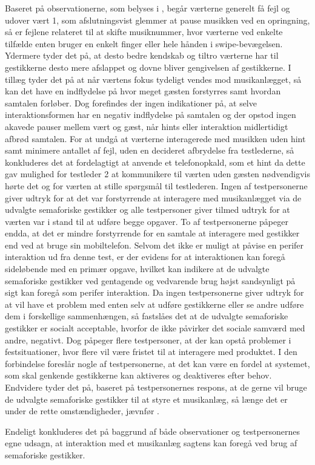 Baseret på observationerne, som belyses i , begår værterne generelt få fejl og udover vært 1, som afslutningsvist glemmer at pause musikken ved en opringning, så er fejlene relateret til at skifte musiknummer, hvor værterne ved enkelte tilfælde enten bruger en enkelt finger eller hele hånden i swipe-bevægelsen. Ydermere tyder det på, at desto bedre kendskab og tiltro værterne har til gestikkerne desto mere afslappet og dovne bliver gengivelsen af gestikkerne. I tillæg tyder det på at når værtens fokus tydeligt vendes mod musikanlægget, så kan det have en indflydelse på hvor meget gæsten forstyrres samt hvordan samtalen forløber. Dog forefindes der ingen indikationer på, at selve interaktionsformen har en negativ indflydelse på samtalen og der opstod ingen akavede pauser mellem vært og gæst, når hints eller interaktion midlertidigt afbrød samtalen. For at undgå at værterne interagerede med musikken uden hint samt minimere antallet af fejl, uden en decideret afbrydelse fra testlederne, så konkluderes det at fordelagtigt at anvende et telefonopkald, som et hint da dette gav mulighed for testleder 2 at kommunikere til værten uden gæsten nødvendigvis hørte det og for værten at stille spørgsmål til testlederen.\blankline
%
Ingen af testpersonerne giver udtryk for at det var forstyrrende at interagere med musikanlægget via de udvalgte semaforiske gestikker og alle testpersoner giver tilmed udtryk for at værten var i stand til at udføre begge opgaver. To af testpersonerne påpeger endda, at det er mindre forstyrrende for en samtale at interagere med gestikker end ved at bruge sin mobiltelefon. Selvom det ikke er muligt at påvise en perifer interaktion ud fra denne test, er der evidens for at interaktionen kan foregå sideløbende med en primær opgave, hvilket kan indikere at de udvalgte semaforiske gestikker ved gentagende og vedvarende brug højst sandsynligt på sigt kan foregå som perifer interaktion. \blankline
%
Da ingen testpersonerne giver udtryk for at vil have et problem med enten selv at udføre gestikkerne eller se andre udføre dem i forskellige sammenhængen, så fastslåes det at de udvalgte semaforiske gestikker er socialt acceptable, hvorfor de ikke påvirker det sociale samværd med andre, negativt. Dog påpeger flere testpersoner, at der kan opstå problemer i festsituationer, hvor flere vil være fristet til at interagere med produktet. I den forbindelse foreslår nogle af testpersonerne, at det kan være en fordel at systemet, som skal genkende gestikkerne kan aktiveres og deaktiveres efter behov. Endvidere tyder det på, baseret på testpersonernes respons, at de gerne vil bruge de udvalgte semaforiske gestikker til at styre et musikanlæg, så længe det er under de rette omstændigheder, jævnfør .  

Endeligt konkluderes det på baggrund af både observationer og testpersonernes egne udsagn, at interaktion med et musikanlæg sagtens kan foregå ved brug af semaforiske gestikker.



